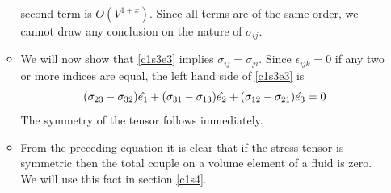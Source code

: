 \begin{itemize}
\begin{itemize}
second term is $O(V^{1 + x})$. Since all terms are of the same order, we cannot draw any conclusion on the nature of $\sigma_{ij}$.
\item We will now show that \eqref{c1s3e3} implies $\sigma_{ij} = \sigma_{ji}$. Since $\epsilon_{ijk} = 0$ if any two or more indices are equal, the left hand side of \eqref{c1s3e3} is
\[
(\sigma_{23} - \sigma_{32})\hat{e_{1}} + (\sigma_{31} - \sigma_{13})\hat{e_{2}} + (\sigma_{12} - \sigma_{21})\hat{e_{3}} = 0
\]
The symmetry of the tensor follows immediately.
\item From the preceding equation it is clear that if the stress tensor is symmetric then the total couple on a volume element of a fluid is zero. We will use this fact in section 
\ref{c1s4}.
\end{itemize}
\end{itemize}

